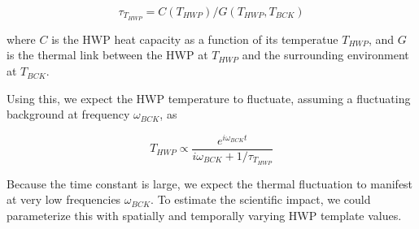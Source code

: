 \begin{equation}
\tau_{T_{HWP}} = C(T_{HWP})/G(T_{HWP}, T_{BCK})
\end{equation}

where $C$ is the HWP heat capacity as a function of its temperatue $T_{HWP}$, and $G$ is the thermal link between the HWP at $T_{HWP}$ and the surrounding environment at $T_{BCK}$. 

Using this, we expect the HWP temperature to fluctuate, assuming a fluctuating background at frequency $\omega_{BCK}$, as

 \begin{equation} 
 T_{HWP} \propto \frac{e^{i \omega_{BCK} t}}{i \omega_{BCK} + 1/\tau_{T_{HWP}}}
 \end{equation}
 
 Because the time constant is large, we expect the thermal fluctuation to manifest at very low frequencies $\omega_{BCK}$. To estimate the scientific impact, we could parameterize this with spatially and temporally varying HWP template values.
